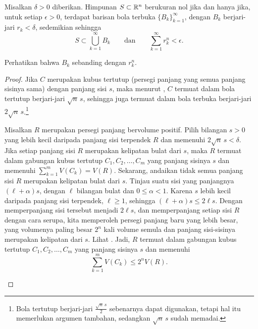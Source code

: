 \begin{prop} \label{mv:prop:ballsnull}
Misalkan $\delta > 0$ diberikan. Himpunan $S \subset {\mathbb{R}}^n$ berukuran nol jika
dan hanya jika, untuk setiap $\epsilon > 0$, terdapat barisan bola terbuka
$\{ B_k \}_{k=1}^\infty$, dengan $B_k$ berjari-jari $r_k < \delta$,
sedemikian sehingga
\begin{equation*}
S \subset \bigcup_{k=1}^\infty B_k \qquad \text{dan} \qquad
\sum_{k=1}^\infty r_k^n < \epsilon.
\end{equation*}
\end{prop}

Perhatikan bahwa  $B_k$ sebanding dengan $r_k^n$.

\begin{proof}
Jika $C$ merupakan kubus tertutup (persegi panjang yang semua panjang sisinya
sama) dengan panjang sisi $s$, maka menurut
, $C$ termuat dalam bola tertutup berjari-jari
$\sqrt{n}\,s$, sehingga juga termuat dalam bola terbuka berjari-jari
$2\sqrt{n}\,s$.\footnote{%
Bola tertutup berjari-jari $\frac{\sqrt{n}\,s}{2}$ sebenarnya dapat digunakan,
tetapi hal itu memerlukan argumen tambahan, sedangkan $\sqrt{n}\,s$ sudah
memadai.}

Misalkan $R$ merupakan persegi panjang bervolume positif. Pilih bilangan
$s>0$ yang lebih kecil daripada panjang sisi terpendek $R$ dan memenuhi
$2\sqrt{n}\,s<\delta$. Jika setiap panjang sisi $R$ merupakan kelipatan bulat
dari $s$, maka $R$ termuat dalam gabungan kubus tertutup
$C_1,C_2,\ldots,C_m$ yang panjang sisinya $s$ dan memenuhi
$\sum_{k=1}^m V(C_k)=V(R)$. Sekarang, andaikan tidak semua panjang sisi $R$
merupakan kelipatan bulat dari $s$. Tinjau suatu sisi yang panjangnya
$(\ell+\alpha)s$, dengan $\ell$ bilangan bulat dan $0\leq\alpha<1$. Karena
$s$ lebih kecil daripada panjang sisi terpendek, $\ell\geq1$, sehingga
$(\ell+\alpha)s\leq2\ell s$. Dengan memperpanjang sisi tersebut menjadi
$2\ell s$, dan memperpanjang setiap sisi $R$ dengan cara serupa, kita
memperoleh persegi panjang baru yang lebih besar, yang volumenya paling besar
$2^n$ kali volume semula dan panjang sisi-sisinya merupakan kelipatan dari
$s$. Lihat . Jadi, $R$ termuat dalam gabungan
kubus tertutup $C_1,C_2,\ldots,C_m$ yang panjang sisinya $s$ dan memenuhi
\begin{equation*}
\sum_{k=1}^m V(C_k) \leq 2^n V(R) .
\end{equation*}

\begin{myfigureht}
\caption{Menutupi persegi panjang dengan kubus-kubus yang volume totalnya
paling besar $2^n V(R)$.\label{fig:nullrectcube}}
\end{myfigureht}


\end{proof}
